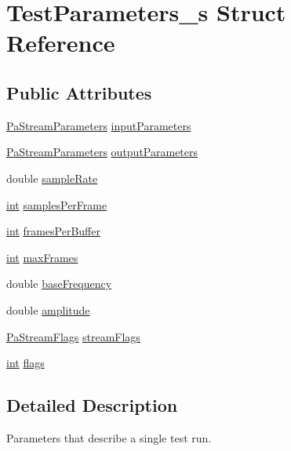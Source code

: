 \hypertarget{struct_test_parameters__s}{}\section{Test\+Parameters\+\_\+s Struct Reference}
\label{struct_test_parameters__s}
\subsection*{Public Attributes}
\begin{DoxyCompactItemize}
\item 
\hyperlink{struct_pa_stream_parameters}{Pa\+Stream\+Parameters} \hyperlink{struct_test_parameters__s_ad3d694d991b41818a04f9383db237e0b}{input\+Parameters}
\item 
\hyperlink{struct_pa_stream_parameters}{Pa\+Stream\+Parameters} \hyperlink{struct_test_parameters__s_afaf313a18a29e522af5439288b3f868a}{output\+Parameters}
\item 
double \hyperlink{struct_test_parameters__s_a12f734501858fdc9dcc1b7bea6fc6c03}{sample\+Rate}
\item 
\hyperlink{xmltok_8h_a5a0d4a5641ce434f1d23533f2b2e6653}{int} \hyperlink{struct_test_parameters__s_ae0b69169e6c00794d02a8ebdea49b9d4}{samples\+Per\+Frame}
\item 
\hyperlink{xmltok_8h_a5a0d4a5641ce434f1d23533f2b2e6653}{int} \hyperlink{struct_test_parameters__s_a39d00b4e551dcfd120988a7abb4b7d92}{frames\+Per\+Buffer}
\item 
\hyperlink{xmltok_8h_a5a0d4a5641ce434f1d23533f2b2e6653}{int} \hyperlink{struct_test_parameters__s_a7c55a9a0b1effe81c85ee1264cccc1a0}{max\+Frames}
\item 
double \hyperlink{struct_test_parameters__s_ae25f9b5ff6229a0af9fc432607aba2a7}{base\+Frequency}
\item 
double \hyperlink{struct_test_parameters__s_acceb914d6148384e4fb344157bc4c057}{amplitude}
\item 
\hyperlink{portaudio_8h_a37c7ac3ace7d2dd1430f40ecdee4ebb6}{Pa\+Stream\+Flags} \hyperlink{struct_test_parameters__s_ac598b23480787633ec413edf3513d489}{stream\+Flags}
\item 
\hyperlink{xmltok_8h_a5a0d4a5641ce434f1d23533f2b2e6653}{int} \hyperlink{struct_test_parameters__s_ac1428cda918879ae303f9f8a1182e39a}{flags}
\end{DoxyCompactItemize}


\subsection{Detailed Description}
Parameters that describe a single test run. 

